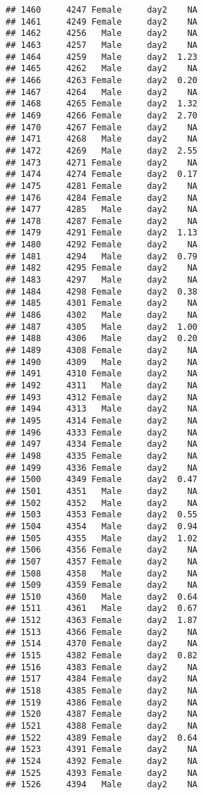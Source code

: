 \documentclass[
]{article}
\begin{document}
\begin{verbatim}
## 1460     4247 Female     day2    NA
## 1461     4249 Female     day2    NA
## 1462     4256   Male     day2    NA
## 1463     4257   Male     day2    NA
## 1464     4259   Male     day2  1.23
## 1465     4262   Male     day2    NA
## 1466     4263 Female     day2  0.20
## 1467     4264   Male     day2    NA
## 1468     4265 Female     day2  1.32
## 1469     4266 Female     day2  2.70
## 1470     4267 Female     day2    NA
## 1471     4268   Male     day2    NA
## 1472     4269   Male     day2  2.55
## 1473     4271 Female     day2    NA
## 1474     4274 Female     day2  0.17
## 1475     4281 Female     day2    NA
## 1476     4284 Female     day2    NA
## 1477     4285   Male     day2    NA
## 1478     4287 Female     day2    NA
## 1479     4291 Female     day2  1.13
## 1480     4292 Female     day2    NA
## 1481     4294   Male     day2  0.79
## 1482     4295 Female     day2    NA
## 1483     4297   Male     day2    NA
## 1484     4298 Female     day2  0.38
## 1485     4301 Female     day2    NA
## 1486     4302   Male     day2    NA
## 1487     4305   Male     day2  1.00
## 1488     4306   Male     day2  0.20
## 1489     4308 Female     day2    NA
## 1490     4309   Male     day2    NA
## 1491     4310 Female     day2    NA
## 1492     4311   Male     day2    NA
## 1493     4312 Female     day2    NA
## 1494     4313   Male     day2    NA
## 1495     4314 Female     day2    NA
## 1496     4333 Female     day2    NA
## 1497     4334 Female     day2    NA
## 1498     4335 Female     day2    NA
## 1499     4336 Female     day2    NA
## 1500     4349 Female     day2  0.47
## 1501     4351   Male     day2    NA
## 1502     4352   Male     day2    NA
## 1503     4353 Female     day2  0.55
## 1504     4354   Male     day2  0.94
## 1505     4355   Male     day2  1.02
## 1506     4356 Female     day2    NA
## 1507     4357 Female     day2    NA
## 1508     4358   Male     day2    NA
## 1509     4359 Female     day2    NA
## 1510     4360   Male     day2  0.64
## 1511     4361   Male     day2  0.67
## 1512     4363 Female     day2  1.87
## 1513     4366 Female     day2    NA
## 1514     4370 Female     day2    NA
## 1515     4382 Female     day2  0.82
## 1516     4383 Female     day2    NA
## 1517     4384 Female     day2    NA
## 1518     4385 Female     day2    NA
## 1519     4386 Female     day2    NA
## 1520     4387 Female     day2    NA
## 1521     4388 Female     day2    NA
## 1522     4389 Female     day2  0.64
## 1523     4391 Female     day2    NA
## 1524     4392 Female     day2    NA
## 1525     4393 Female     day2    NA
## 1526     4394   Male     day2    NA

\end{verbatim}
\end{document}
